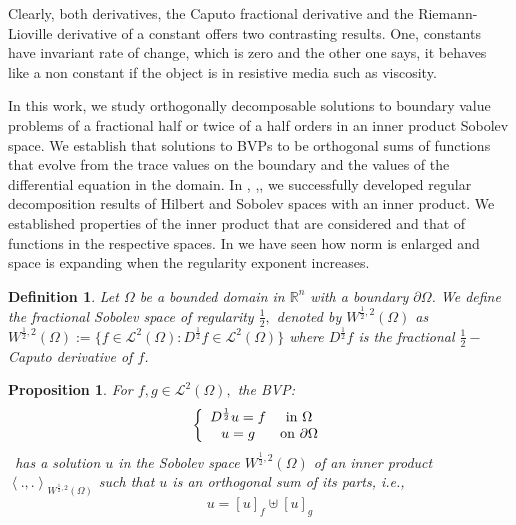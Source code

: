 \documentclass{amsart}%
\providecommand{\U}[1]{\protect\rule{.1in}{.1in}}
\theoremstyle{plain}
\newtheorem{definition}{Definition}
\newtheorem{proposition}{Proposition}
\numberwithin{equation}{section}
\begin{document}
Clearly, both derivatives, the Caputo fractional derivative and the
Riemann-Lioville derivative of a constant offers two contrasting results. One,
constants have invariant rate of change, which is zero and the other one says,
it behaves like a non constant if the object is in resistive media such as viscosity.

In this work, we study orthogonally decomposable solutions to boundary value
problems of a fractional half or twice of a half orders in an inner product
Sobolev space. We establish that solutions to BVPs to be orthogonal sums of
functions that evolve from the trace values on the boundary and the values of
the differential equation in the domain. In \cite{dlakew1},\cite{dlakew2}%
,\cite{lakewryan1},\cite{lakewryan2} we successfully developed regular
decomposition results of Hilbert and Sobolev spaces with an inner product. We
established properties of the inner product that are considered and that of
functions in the respective spaces. In \cite{dlakew1} we have seen how norm is
enlarged and space is expanding when the regularity exponent increases.

\begin{definition}
Let $\Omega$ be a bounded domain in $%
\mathbb{R}
^{n}$ with a boundary $\partial\Omega$. We define the fractional Sobolev space
of regularity $\frac{1}{2},$ denoted by $W^{\frac{1}{2},2}\left(
\Omega\right)  $ as $W^{\frac{1}{2},2}\left(  \Omega\right)  :=\{f\in%
\mathcal{L}%
^{2}\left(  \Omega\right)  :D^{\frac{1}{2}}f\in%
\mathcal{L}%
^{2}\left(  \Omega\right)  \}$ where $D^{\frac{1}{2}}f$ is the fractional
$\frac{1}{2}-$Caputo derivative of $f$.
\end{definition}

\begin{proposition}
For $f,g\in%
\mathcal{L}%
^{2}\left(  \Omega\right)  ,$ the BVP:
\begin{equation}
\left\{
\begin{array}
[c]{cc}%
D^{\frac{1}{2}}u=f & \text{in }\Omega\\
u=g & \text{on }\partial\Omega
\end{array}
\right. \label{bvp1}%
\end{equation}
\ has a solution $u$ in the Sobolev space $W^{\frac{1}{2},2}(\Omega)$ of an
inner product $\left\langle .,.\right\rangle _{W^{\frac{1}{2},2}\left(
\Omega\right)  }$ such that $u$ is an orthogonal sum of its parts, i.e.,
\begin{equation}
u=\left[  u\right]  _{f}\uplus\left[  u\right]  _{g}\label{dirctsum1}%
\end{equation}

\end{proposition}
\end{document}
